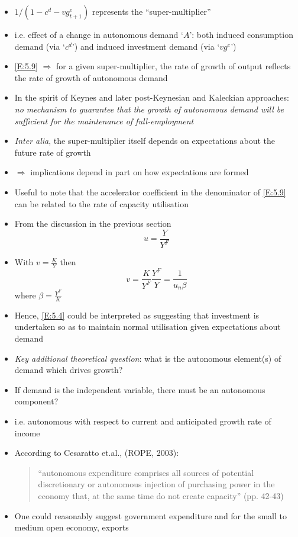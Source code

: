 \documentclass[a4paper,twoside]{article}
\numberwithin{equation}{section}
\numberwithin{figure}{section}
\begin{document}
\begin{itemize}
\begin{equation}
		\end{equation}
		\item \( 1/\left( 1-c^d-vg_{t+1}^e \right) \) represents the ``super-multiplier''
		\item i.e. effect of a change in autonomous demand `\( A \)': both induced consumption demand (via `\( c^d \)') and induced investment demand (via `\( v g^e \)')
		\item \cref{E:5.9} \( \Rightarrow \) for a given super-multiplier, the rate of growth of output reflects the rate of growth of autonomous demand
		\item In the spirit of Keynes and later post-Keynesian and Kaleckian approaches: \textit{no mechanism to guarantee that the growth of autonomous demand will be sufficient for the maintenance of full-employment}
		\item \textit{Inter alia}, the super-multiplier itself depends on expectations about the future rate of growth
		\item \( \Rightarrow \) implications depend in part on how expectations are formed
		\item Useful to note that the accelerator coefficient in the denominator of \cref{E:5.9} can be related to the rate of capacity utilisation
		\item From the discussion in the previous section
		\[
			u = \frac{Y}{Y^F}
		\]
		\item With \( v=\frac{K}{Y} \) then
		\[
			v=\frac{K}{Y^F}\frac{Y^F}{Y}=\frac{1}{u_n\beta}
		\]
		where \( \beta=\frac{Y^F}{K} \)
		\item Hence, \cref{E:5.4} could be interpreted as suggesting that investment is undertaken so as to maintain normal utilisation given expectations about demand
		\item \textit{Key additional theoretical question}: what is the autonomous element(s) of demand which drives growth?
		\item If demand is the independent variable, there must be an autonomous component?
		\item i.e. autonomous with respect to current and anticipated growth rate of income
		\item According to Cesaratto et.al., (ROPE, 2003):
		\begin{quote}
			``autonomous expenditure comprises all sources of potential discretionary or autonomous injection of purchasing power in the economy that, at the same time do not create capacity'' (pp. 42-43)
		\end{quote}
		\item One could reasonably suggest government expenditure and for the small to medium open economy, exports

\end{itemize}
\end{document}
